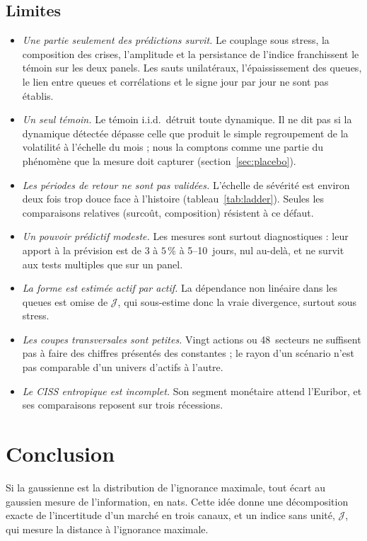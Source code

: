 \documentclass[11pt]{article}
\theoremstyle{definition}
\newcommand{\JJ}{\mathcal{J}}
\begin{document}
\subsection{Limites}

\begin{itemize}
\item \emph{Une partie seulement des prédictions survit.} Le couplage sous
stress, la composition des crises, l'amplitude et la persistance de l'indice
franchissent le témoin sur les deux panels. Les sauts unilatéraux,
l'épaississement des queues, le lien entre queues et corrélations et le signe
jour par jour ne sont pas établis.
\item \emph{Un seul témoin.} Le témoin i.i.d.\ détruit toute dynamique. Il ne
dit pas si la dynamique détectée dépasse celle que produit le simple
regroupement de la volatilité à l'échelle du mois ; nous la comptons comme
une partie du phénomène que la mesure doit capturer
(section~\ref{sec:placebo}).
\item \emph{Les périodes de retour ne sont pas validées.} L'échelle de
sévérité est environ deux fois trop douce face à l'histoire
(tableau~\ref{tab:ladder}). Seules les comparaisons relatives (surcoût,
composition) résistent à ce défaut.
\item \emph{Un pouvoir prédictif modeste.} Les mesures sont surtout
diagnostiques : leur apport à la prévision est de $3$ à $5\,\%$ à 5--10~jours,
nul au-delà, et ne survit aux tests multiples que sur un panel.
\item \emph{La forme est estimée actif par actif.} La dépendance non linéaire
dans les queues est omise de $\JJ$, qui sous-estime donc la vraie divergence,
surtout sous stress.
\item \emph{Les coupes transversales sont petites.} Vingt actions ou 48~secteurs
ne suffisent pas à faire des chiffres présentés des constantes ; le rayon d'un
scénario n'est pas comparable d'un univers d'actifs à l'autre.
\item \emph{Le CISS entropique est incomplet.} Son segment monétaire attend
l'Euribor, et ses comparaisons reposent sur trois récessions.
\end{itemize}

\section{Conclusion}
\label{sec:conclusion}

Si la gaussienne est la distribution de l'ignorance maximale, tout écart au
gaussien mesure de l'information, en nats. Cette idée donne une décomposition
exacte de l'incertitude d'un marché en trois canaux, et un indice sans unité,
$\JJ$, qui mesure la distance à l'ignorance maximale.
\end{document}
